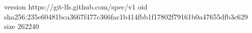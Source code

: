 version https://git-lfs.github.com/spec/v1
oid sha256:235e60481bca3667f477c366fac1b414fbb1f17802f79161b0a47655dfb3c629
size 262240
